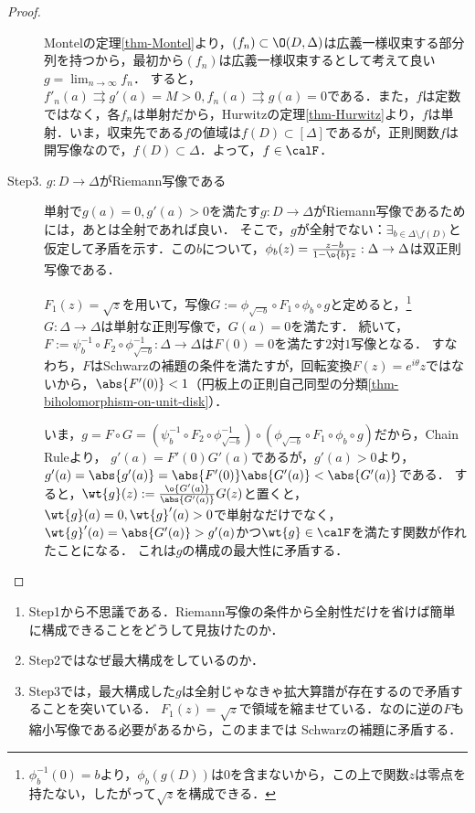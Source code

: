 \documentclass[uplatex, dvipdfmx]{jsreport}
\begin{document}
\begin{proof}
\begin{description}
        Montelの定理\ref{thm-Montel}より，$(f_n)\subset\O(D,\Delta)$は広義一様収束する部分列を持つから，最初から$(f_n)$は広義一様収束するとして考えて良い$g=\lim_{n\to\infty}f_n$．
        すると，$f'_n(a)\rightrightarrows g'(a)=M>0,f_n(a)\rightrightarrows g(a)=0$である．また，$f$は定数ではなく，各$f_n$は単射だから，Hurwitzの定理\ref{thm-Hurwitz}より，$f$は単射．いま，収束先である$f$の値域は$f(D)\subset[\Delta]$であるが，正則関数$f$は開写像なので，$f(D)\subset\Delta$．よって，$f\in\calF$．
        \item[Step3. $g:D\to\Delta$がRiemann写像である] 単射で$g(a)=0,g'(a)>0$を満たす$g:D\to\Delta$がRiemann写像であるためには，あとは全射であれば良い．
        そこで，$g$が全射でない：$\exists_{b\in\Delta\setminus f(D)}$と仮定して矛盾を示す．この$b$について，$\phi_b(z)=\frac{z-b}{1-\o{b}z}:\Delta\to\Delta$は双正則写像である．

        $F_1(z)=\sqrt{z}$を用いて，写像$G:=\phi_{\sqrt{-b}}\circ F_1\circ\phi_b\circ g$と定めると，\footnote{$\phi_b^{-1}(0)=b$より，$\phi_b(g(D))$は$0$を含まないから，この上で関数$z$は零点を持たない，したがって$\sqrt{z}$を構成できる．}
        $G:\Delta\to\Delta$は単射な正則写像で，$G(a)=0$を満たす．
        続いて，$F:=\psi_b^{-1}\circ F_2\circ\phi^{-1}_{\sqrt{-b}}:\Delta\to\Delta$は$F(0)=0$を満たす$2$対$1$写像となる．
        すなわち，$F$はSchwarzの補題の条件を満たすが，回転変換$F(z)=e^{i\theta}z$ではないから，$\abs{F'(0)}<1$（円板上の正則自己同型の分類\ref{thm-biholomorphism-on-unit-disk}）．

        いま，$g=F\circ G=(\psi_b^{-1}\circ F_2\circ\phi^{-1}_{\sqrt{-b}})\circ(\phi_{\sqrt{-b}}\circ F_1\circ\phi_b\circ g)$だから，Chain Ruleより，
        $g'(a)=F'(0)G'(a)$であるが，$g'(a)>0$より，$g'(a)=\abs{g'(a)}=\abs{F'(0)}\abs{G'(a)}<\abs{G'(a)}$である．
        すると，$\wt{g}(z):=\frac{\o{G'(a)}}{\abs{G'(a)}}G(z)$と置くと，$\wt{g}(a)=0,\wt{g}'(a)>0$で単射なだけでなく，$\wt{g}'(a)=\abs{G'(a)}>g'(a)$かつ$\wt{g}\in\calF$を満たす関数が作れたことになる．
        これは$g$の構成の最大性に矛盾する．
    \end{description}
\end{proof}
\begin{remarks}\mbox{}
    \begin{enumerate}
        \item Step1から不思議である．Riemann写像の条件から全射性だけを省けば簡単に構成できることをどうして見抜けたのか．
        \item Step2ではなぜ最大構成をしているのか．
        \item Step3では，最大構成した$g$は全射じゃなきゃ拡大算譜が存在するので矛盾することを突いている．
        $F_1(z)=\sqrt{z}$で領域を縮ませている．なのに逆の$F$も縮小写像である必要があるから，このままでは
        Schwarzの補題に矛盾する．
    \end{enumerate}
\end{remarks}
\end{document}

